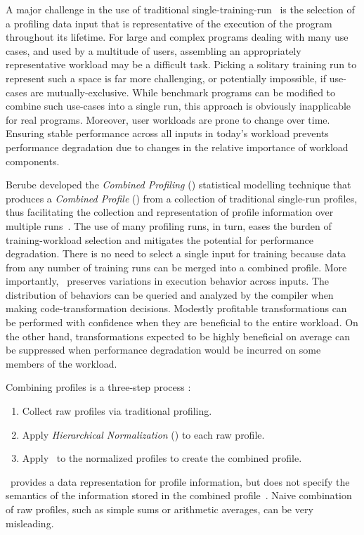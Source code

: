 A major challenge in the use of traditional single-training-run \FDO\
is the selection of a profiling data input that is representative of
the execution of the program throughout its lifetime.  For large and
complex programs dealing with many use cases, and used by a multitude
of users, assembling an appropriately representative workload may be a
difficult task.  Picking a solitary training run to represent such a
space is far more challenging, or potentially impossible, if use-cases
are mutually-exclusive.  While benchmark programs can be modified to
combine such use-cases into a single run,
this approach is obviously inapplicable for real programs.  Moreover,
user workloads are prone to change over time.  Ensuring stable
performance across all inputs in today's workload prevents performance
degradation due to changes in the relative importance of workload
components.

Berube developed the {\em Combined Profiling} (\CP) statistical modelling technique that produces a {\it Combined Profile} (\CProf)
from a collection of traditional single-run profiles, thus
facilitating the collection and representation of profile information
over multiple runs~\cite{BerubePhD}. The use of many profiling runs, in turn, eases the
burden of training-workload selection and mitigates the potential for
performance degradation.  There is no need to select a single input
for training because data from any number of training runs can be
merged into a combined profile.  More importantly, \CP\ preserves
variations in execution behavior across inputs.  The distribution of
behaviors can be queried and analyzed by the compiler when making
code-transformation decisions.  Modestly profitable transformations
can be performed with confidence when they are beneficial to the
entire workload. On the other hand, transformations expected to be
highly beneficial on average can be suppressed when performance
degradation would be incurred on some members of the workload.

Combining profiles is a three-step process \cite{BerubeISPASS12}:
\begin{enumerate}
\item Collect raw profiles via traditional profiling.
\item Apply {\em Hierarchical Normalization} (\HN) to each raw profile. 
\item Apply \CP\ to the normalized profiles to create the combined profile.
\end{enumerate}
\CP\ provides a data representation for profile information, but does
not specify the semantics of the information stored in the combined
profile~\cite{BerubeICPE11}.  Naive combination of raw profiles, such as simple sums or arithmetic averages, can be very misleading.

